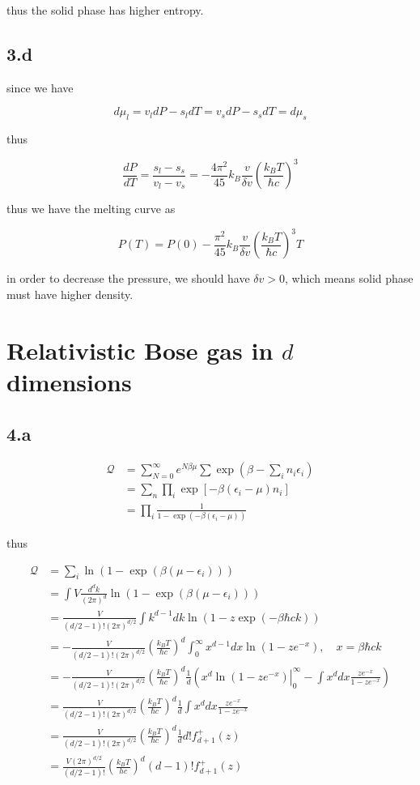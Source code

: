 \documentclass{article}
\begin{document}
thus the solid phase has higher entropy.

\subsection*{3.d}

since we have

$$
d\mu_l = v_l dP - s_l dT = v_s dP - s_s dT = d\mu_s
$$

thus

$$
\frac{dP}{dT} = \frac{s_l - s_s}{v_l - v_s} = -\frac{4\pi^2}{45} k_B \frac{v}{\delta v} (\frac{k_B T}{\hbar c})^3
$$

thus we have the melting curve as

$$
P(T) = P(0) -\frac{\pi^2}{45} k_B \frac{v}{\delta v} (\frac{k_B T}{\hbar c})^3 T
$$

in order to decrease the pressure, we should have $\delta v > 0$, which means solid phase must have higher density. 

\section*{Relativistic Bose gas in $d$ dimensions}
\subsection*{4.a}

$$
\begin{aligned}
    \mathcal{Q} &= \sum_{N=0}^{\infty} e^{N\beta \mu} \sum \exp(\beta -\sum_i n_i \epsilon_i)\\
    &= \sum_{n} \prod_i \exp[-\beta (\epsilon_i - \mu)n_i]\\
    &= \prod_i \frac{1}{1 - \exp(-\beta(\epsilon_i - \mu))}
\end{aligned}
$$

thus

$$
\begin{aligned}
    \mathcal{Q} &= \sum_i \ln(1 - \exp(\beta(\mu - \epsilon_i)))\\
    &= \int V \frac{d^dk}{(2\pi)^d} \ln(1 - \exp(\beta(\mu - \epsilon_i)))\\
    &= \frac{V}{(d/2 - 1)! (2\pi)^{d/2}}\int k^{d-1}dk \ln(1 - z\exp(-\beta \hbar c k))\\
    &= -\frac{V}{(d/2 - 1)! (2\pi)^{d/2}} (\frac{k_B T}{\hbar c})^d \int_0^{\infty} x^{d-1} dx \ln(1 - ze^{-x}), \quad x = \beta\hbar ck\\
    &= -\frac{V}{(d/2 - 1)! (2\pi)^{d/2}} (\frac{k_B T}{\hbar c})^d \frac{1}{d}(\left. x^d \ln(1 - ze^{-x})\right|_{0}^{\infty} - \int x^d dx \frac{z e^{-x}}{1-ze^{-x}})\\
    &= \frac{V}{(d/2 - 1)! (2\pi)^{d/2}} (\frac{k_B T}{\hbar c})^d \frac{1}{d} \int x^d dx \frac{z e^{-x}}{1-ze^{-x}}\\
    &= \frac{V}{(d/2 - 1)! (2\pi)^{d/2}} (\frac{k_B T}{\hbar c})^d \frac{1}{d} d! f_{d+1}^{+}(z)\\
    &= \frac{V (2\pi)^{d/2}}{(d/2 - 1)!} (\frac{k_B T}{h c})^d (d-1)! f_{d+1}^{+}(z)\\
\end{aligned}
$$
\end{document}

